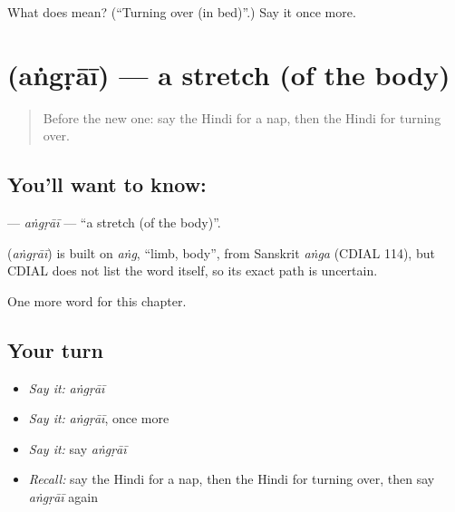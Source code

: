 \begin{tcolorbox}[breakable,colback=teal!4,colframe=teal!35!black,title={Before you move on}]
What does  mean? (\textquotedblleft{}Turning over (in bed)\textquotedblright{}.) Say it once more.
\end{tcolorbox}
\section[\texorpdfstring{\hi{अंगड़ाई} (aṅgṛāī)}{अंगड़ाई (aṅgṛāī)}]{ (aṅgṛāī) — a stretch (of the body)}

\label{lesson:HI-C275-angrai}



\begin{quote}
Before the new one: say the Hindi for a nap, then the Hindi for turning over.
\end{quote}

\subsection*{You'll want to know: }
\textbf{} — \emph{aṅgṛāī} — \textquotedblleft{}a stretch (of the body)\textquotedblright{}.

\begin{cousinweb}
\textbf{} (\emph{aṅgṛāī}) is built on \emph{aṅg}, \textquotedblleft{}limb, body\textquotedblright{}, from Sanskrit \emph{aṅga} (CDIAL 114), but CDIAL does not list the word itself, so its exact path is uncertain.
\end{cousinweb}

\begin{grammarlens}[title={What you've built}]
One more word for this chapter.
\end{grammarlens}

\subsection*{Your turn}
\begin{itemize}
\raggedright
  \item \emph{Say it:} \emph{aṅgṛāī}
  \item \emph{Say it:} \emph{aṅgṛāī}, once more
  \item \emph{Say it:} say \emph{aṅgṛāī}
  \item \emph{Recall:} say the Hindi for a nap, then the Hindi for turning over, then say \emph{aṅgṛāī} again
\end{itemize}

